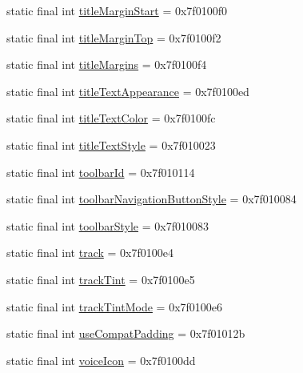 \begin{CompactItemize}
\item 
static final int \hyperlink{classcom_1_1companyname_1_1x__2doo_1_1_r_1_1attr_f6e10ded72b8728c215df0126a226b7e}{titleMarginStart} = 0x7f0100f0
\item 
static final int \hyperlink{classcom_1_1companyname_1_1x__2doo_1_1_r_1_1attr_e2fcf93b6f5f16306b3eb381362f7837}{titleMarginTop} = 0x7f0100f2
\item 
static final int \hyperlink{classcom_1_1companyname_1_1x__2doo_1_1_r_1_1attr_13a8e062a2cd0a3ea42fe3376622f46d}{titleMargins} = 0x7f0100f4
\item 
static final int \hyperlink{classcom_1_1companyname_1_1x__2doo_1_1_r_1_1attr_1dfbda9d281812236b99a626c5cad5f2}{titleTextAppearance} = 0x7f0100ed
\item 
static final int \hyperlink{classcom_1_1companyname_1_1x__2doo_1_1_r_1_1attr_82d4d30477ffe7011f23274c9ec965a5}{titleTextColor} = 0x7f0100fc
\item 
static final int \hyperlink{classcom_1_1companyname_1_1x__2doo_1_1_r_1_1attr_dcb150fd31ab9183bee97759585558cd}{titleTextStyle} = 0x7f010023
\item 
static final int \hyperlink{classcom_1_1companyname_1_1x__2doo_1_1_r_1_1attr_fd9b34624e9d0708534d23b4f1752285}{toolbarId} = 0x7f010114
\item 
static final int \hyperlink{classcom_1_1companyname_1_1x__2doo_1_1_r_1_1attr_80b08220a3c645e21c79e7965119576e}{toolbarNavigationButtonStyle} = 0x7f010084
\item 
static final int \hyperlink{classcom_1_1companyname_1_1x__2doo_1_1_r_1_1attr_d37e97fa29025fc2ba46df7d6e0a01ec}{toolbarStyle} = 0x7f010083
\item 
static final int \hyperlink{classcom_1_1companyname_1_1x__2doo_1_1_r_1_1attr_b09ab26417791942037d9beb93718a25}{track} = 0x7f0100e4
\item 
static final int \hyperlink{classcom_1_1companyname_1_1x__2doo_1_1_r_1_1attr_4e09abbece43caf8fd5e77207b47d7f1}{trackTint} = 0x7f0100e5
\item 
static final int \hyperlink{classcom_1_1companyname_1_1x__2doo_1_1_r_1_1attr_7a4dd405e28b37f253244028762d079f}{trackTintMode} = 0x7f0100e6
\item 
static final int \hyperlink{classcom_1_1companyname_1_1x__2doo_1_1_r_1_1attr_5766848d838192d625703690cc6213fc}{useCompatPadding} = 0x7f01012b
\item 
static final int \hyperlink{classcom_1_1companyname_1_1x__2doo_1_1_r_1_1attr_ee7d698d776fc746f308cf5eba381f11}{voiceIcon} = 0x7f0100dd

\end{CompactItemize}
